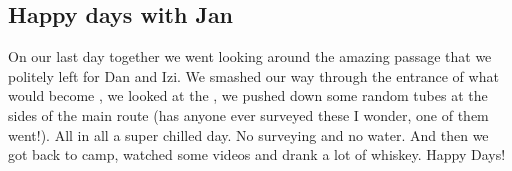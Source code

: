 



\subsection{Happy days with Jan}

On our last day together we went looking around the amazing passage that
we politely left for Dan and Izi. We smashed our way through the
entrance of what would become , we looked at the
, we pushed down some random tubes at the sides of
the main route (has anyone ever surveyed these I wonder, one of them
went!). All in all a super chilled day. No surveying and no water. And
then we got back to camp, watched some videos and drank a lot of
whiskey. Happy Days!



